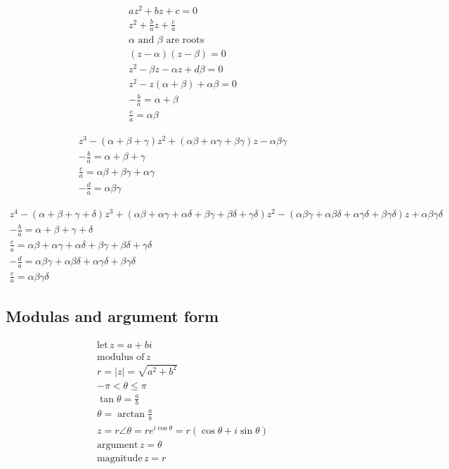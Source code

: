 \documentclass{article}
\begin{document}
\begin{gather}
	az^2 + bz + c = 0 \\
	z^2 + \frac{b}{a}z + \frac{c}{a} \\
	\text{$\alpha$ and $\beta$ are roots} \\
	(z - \alpha)(z - \beta) = 0\\
	z^2 - \beta z - \alpha z + d \beta = 0 \\
	z^2 - z(\alpha + \beta) + \alpha \beta = 0 \\
	-\frac{b}{a} = \alpha + \beta \\
	\frac{c}{a} = \alpha \beta
\end{gather}

\begin{gather}
	z^3 - (\alpha + \beta + \gamma)z^2 + (\alpha \beta + \alpha \gamma + \beta \gamma) z - \alpha \beta \gamma \\
	-\frac{b}{a} = \alpha + \beta + \gamma \\
	\frac{c}{a} = \alpha \beta + \beta \gamma + \alpha \gamma \\
	-\frac{d}{a} = \alpha \beta \gamma
\end{gather}

\begin{gather}
	z^4
	- (\alpha + \beta + \gamma + \delta) z^3
	+ (\alpha \beta + \alpha \gamma + \alpha \delta + \beta \gamma + \beta \delta + \gamma \delta) z^2
	- (\alpha \beta \gamma + \alpha \beta \delta + \alpha \gamma \delta + \beta \gamma \delta)z
	+ \alpha \beta \gamma \delta \\
	-\frac{b}{a} = \alpha + \beta + \gamma + \delta \\
	\frac{c}{a} = \alpha \beta + \alpha \gamma + \alpha \delta + \beta \gamma + \beta \delta + \gamma \delta \\
	-\frac{d}{a} = \alpha \beta \gamma + \alpha \beta \delta + \alpha \gamma \delta + \beta \gamma \delta \\
	\frac{e}{a} = \alpha \beta \gamma \delta
\end{gather}

\subsection{Modulas and argument form}
\begin{gather}
	\text{let}\, z = a + bi \\
	\text{modulus of}\, z \\
	r = |z| = \sqrt{a^2 + b^2} \\
	-\pi < \theta \le \pi \\
	\tan \theta = \frac{a}{b} \\
	\theta = \arctan \frac{a}{b}\\
	z = r \angle \theta = r e^{i \cos \theta} =  r(\cos \theta + i \sin \theta) \\
	\text{argument}\, z = \theta \\
	\text{magnitude}\, z = r
\end{gather}
\end{document}
